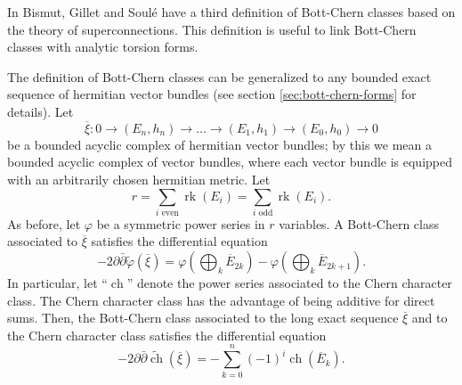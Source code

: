 \documentclass[10pt,twoside]{article}
\numberwithin{equation}{section}
\theoremstyle{plain}
\theoremstyle{definition}
\DeclareMathOperator{\ch}{ch}
\DeclareMathOperator{\rk}{rk}
\begin{document}
In \cite{BismutGilletSoule:at} Bismut, Gillet and
Soul\'e have a third definition of Bott-Chern classes based
on the theory of superconnections. This definition is useful to link
Bott-Chern classes with analytic torsion forms.

The definition of Bott-Chern classes can be generalized to any
bounded exact sequence of hermitian vector bundles (see section
\ref{sec:bott-chern-forms} for details). Let
\begin{displaymath}
\overline \xi\colon0\longrightarrow(E_{n},h_{n})\longrightarrow
\dots \longrightarrow (E_{1},h_{1}) 
\longrightarrow(E_{0},h_{0})\longrightarrow 0
\end{displaymath}
be a bounded acyclic complex of hermitian vector bundles; by this we
mean 
a bounded acyclic complex of vector bundles, where each vector bundle
is 
equipped with an arbitrarily chosen hermitian metric. Let
\begin{displaymath}
  r=\sum_{i\text{ even}} \rk(E_{i})=\sum_{i\text{ odd}} \rk(E_{i}). 
\end{displaymath}
As before, let $\varphi$ be a
symmetric power series in $r$ variables. A Bott-Chern class
associated to $\overline \xi$ satisfies the differential equation 
\begin{displaymath}
    -2\partial\bar \partial \widetilde{\varphi}(\overline \xi)=
\varphi(\bigoplus_{k}\overline E_{2k})
- \varphi(\bigoplus_{k}\overline E_{2k+1}).
\end{displaymath}
In particular, let ``$\ch$'' denote the power series associated to the
Chern character class. The Chern character class
has the advantage of being additive for direct sums. Then, the
Bott-Chern class associated to the long exact sequence $\overline
{\xi}$ 
and to the Chern character class satisfies the differential equation 
\begin{displaymath}
  -2\partial\bar \partial \widetilde{\ch}(\overline \xi)=
  -\sum_{k=0}^{n}(-1)^{i}\ch(\overline E_{k}). 
\end{displaymath}
\end{document}
